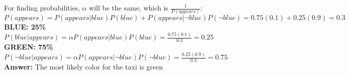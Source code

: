 \documentclass{article}
\begin{document}
\begin{enumerate}
\begin{enumerate}[label=($\alph*$)]
    \color{blue}
        For finding probabilities, $\alpha$ will be the same, which is $\frac{1}{P(appears)}$:\\
        $P(appears)=P(appears|blue)P(blue)+P(appears|\neg blue)P(\neg blue)=0.75(0.1)+0.25(0.9)=0.3$\\
        \textbf{BLUE: 25\%}\\
        $P(blue|appears)=\alpha P(appears|blue)P(blue)=\frac{0.75(0.1)}{0.3}=0.25$\\
        \textbf{GREEN: 75\%}\\
        $P(\neg blue|appears)=\alpha P(appears|\neg blue)P(\neg blue)=\frac{0.25(0.9)}{0.3}=0.75$\\
        \textbf{Answer:} The most likely color for the taxi is green
    \color{black}

    
    \end{enumerate}


\end{enumerate}
\end{document}
